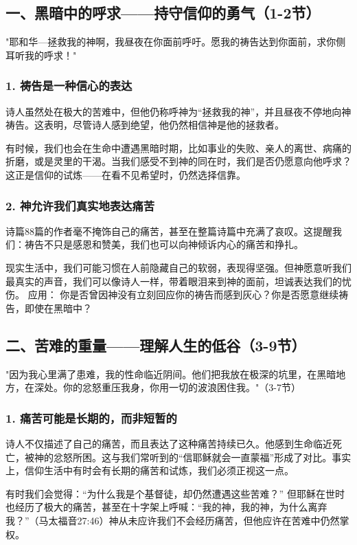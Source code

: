 \documentclass[a4paper, 12pt]{article}
\begin{document}
\subsection*{一、黑暗中的呼求——持守信仰的勇气（1-2节）}
"耶和华—拯救我的神啊，我昼夜在你面前呼吁。愿我的祷告达到你面前，求你侧耳听我的呼求！"
\subsubsection*{1. 祷告是一种信心的表达}
\hspace{0.6cm}诗人虽然处在极大的苦难中，但他仍称呼神为“拯救我的神”，并且昼夜不停地向神祷告。这表明，尽管诗人感到绝望，他仍然相信神是他的拯救者。

有时候，我们也会在生命中遭遇黑暗时期，比如事业的失败、亲人的离世、病痛的折磨，或是灵里的干渴。当我们感受不到神的同在时，我们是否仍愿意向他呼求？ 这正是信仰的试炼——在看不见希望时，仍然选择信靠。
\subsubsection*{2. 神允许我们真实地表达痛苦}
\hspace{0.6cm}诗篇88篇的作者毫不掩饰自己的痛苦，甚至在整篇诗篇中充满了哀叹。这提醒我们：祷告不只是感恩和赞美，我们也可以向神倾诉内心的痛苦和挣扎。

现实生活中，我们可能习惯在人前隐藏自己的软弱，表现得坚强。但神愿意听我们最真实的声音，我们可以像诗人一样，带着眼泪来到神的面前，坦诚表达我们的忧伤。
应用： 你是否曾因神没有立刻回应你的祷告而感到灰心？你是否愿意继续祷告，即使在黑暗中？
\subsection*{二、苦难的重量——理解人生的低谷（3-9节）}
"因为我心里满了患难，我的性命临近阴间。他们把我放在极深的坑里，在黑暗地方，在深处。你的忿怒重压我身，你用一切的波浪困住我。"（3-7节）
\subsubsection*{1. 痛苦可能是长期的，而非短暂的}
\hspace{0.6cm}诗人不仅描述了自己的痛苦，而且表达了这种痛苦持续已久。他感到生命临近死亡，被神的忿怒所困。这与我们常听到的“信耶稣就会一直蒙福”形成了对比。事实上，信仰生活中有时会有长期的痛苦和试炼，我们必须正视这一点。

有时我们会觉得：“为什么我是个基督徒，却仍然遭遇这些苦难？” 但耶稣在世时也经历了极大的痛苦，甚至在十字架上呼喊：“我的神，我的神，为什么离弃我？”（马太福音27:46）神从未应许我们不会经历痛苦，但他应许在苦难中仍然掌权。
\end{document}
